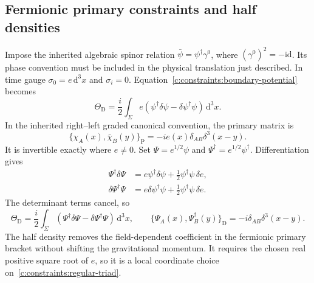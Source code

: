 \subsection{Fermionic primary constraints and half densities}
Impose the inherited algebraic spinor relation $\bar\psi=\psi^\dagger\gamma^0$, where $(\gamma^0)^2=-\mathrm{id}$. Its phase convention must be included in the physical translation just described. In time gauge $\sigma_0=e\,\mathrm d^3x$ and $\sigma_i=0$. Equation~\eqref{c:constraints:boundary-potential} becomes
\begin{equation}
 \Theta_{\mathrm D}=\frac i2\int_\Sigma e
        (\psi^\dagger\delta\psi-\delta\psi^\dagger\psi)\,\mathrm d^3x.
\end{equation}
In the inherited right--left graded canonical convention, the primary matrix is
\begin{equation}
 \{\chi_A(x),\bar\chi_B(y)\}_{\mathrm P}
            =-ie(x)\delta_{AB}\delta^3(x-y).
\end{equation}
It is invertible exactly where $e\ne0$. Set
$\Psi=e^{1/2}\psi$ and $\Psi^\dagger=e^{1/2}\psi^\dagger$.
Differentiation gives
\begin{align}
 \Psi^\dagger\delta\Psi
   &=e\psi^\dagger\delta\psi+\tfrac12\psi^\dagger\psi\,\delta e,\\
 \delta\Psi^\dagger\Psi
   &=e\delta\psi^\dagger\psi+\tfrac12\psi^\dagger\psi\,\delta e.
\end{align}
The determinant terms cancel, so
\begin{equation}
 \Theta_{\mathrm D}=\frac i2\int_\Sigma
       (\Psi^\dagger\delta\Psi-\delta\Psi^\dagger\Psi)\,\mathrm d^3x,
 \qquad
 \{\Psi_A(x),\Psi_B^\dagger(y)\}_{\mathrm D}
             =-i\delta_{AB}\delta^3(x-y).
\end{equation}
The half density removes the field-dependent coefficient in the fermionic primary bracket without shifting the gravitational momentum. It requires the chosen real positive square root of $e$, so it is a local coordinate choice on~\eqref{c:constraints:regular-triad}.

